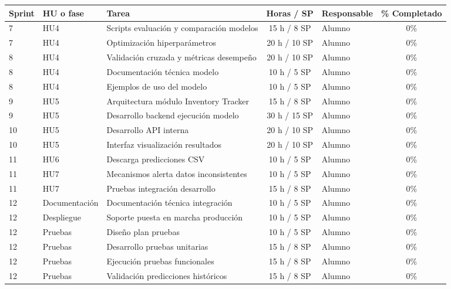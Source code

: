 \documentclass[
11pt, %
]{charter}
\begin{document}
\begin{table}[htpb]
\centering
\begin{tabularx}{\linewidth}{@{}|l|l|X|c|l|c|@{}}
\hline
\rowcolor[HTML]{C0C0C0}
Sprint & HU o fase & Tarea & Horas / SP & Responsable & \% Completado \\ \hline
7 & HU4 & Scripts evaluación y comparación modelos & 15 h / 8 SP & Alumno & 0\% \\ \hline
7 & HU4 & Optimización hiperparámetros & 20 h / 10 SP & Alumno & 0\% \\ \hline
8 & HU4 & Validación cruzada y métricas desempeño & 20 h / 10 SP & Alumno & 0\% \\ \hline
8 & HU4 & Documentación técnica modelo & 10 h / 5 SP & Alumno & 0\% \\ \hline
8 & HU4 & Ejemplos de uso del modelo & 10 h / 5 SP & Alumno & 0\% \\ \hline
9 & HU5 & Arquitectura módulo Inventory Tracker & 15 h / 8 SP & Alumno & 0\% \\ \hline
9 & HU5 & Desarrollo backend ejecución modelo & 30 h / 15 SP & Alumno & 0\% \\ \hline
10 & HU5 & Desarrollo API interna & 20 h / 10 SP & Alumno & 0\% \\ \hline
10 & HU5 & Interfaz visualización resultados & 20 h / 10 SP & Alumno & 0\% \\ \hline
11 & HU6 & Descarga predicciones CSV & 10 h / 5 SP & Alumno & 0\% \\ \hline
11 & HU7 & Mecanismos alerta datos inconsistentes & 10 h / 5 SP & Alumno & 0\% \\ \hline
11 & HU7 & Pruebas integración desarrollo & 15 h / 8 SP & Alumno & 0\% \\ \hline
12 & Documentación & Documentación técnica integración & 10 h / 5 SP & Alumno & 0\% \\ \hline
12 & Despliegue & Soporte puesta en marcha producción & 10 h / 5 SP & Alumno & 0\% \\ \hline
12 & Pruebas & Diseño plan pruebas & 10 h / 5 SP & Alumno & 0\% \\ \hline
12 & Pruebas & Desarrollo pruebas unitarias & 15 h / 8 SP & Alumno & 0\% \\ \hline
12 & Pruebas & Ejecución pruebas funcionales & 15 h / 8 SP & Alumno & 0\% \\ \hline
12 & Pruebas & Validación predicciones históricos & 15 h / 8 SP & Alumno & 0\% \\ \hline
\end{tabularx}
\end{table}
\end{document}
